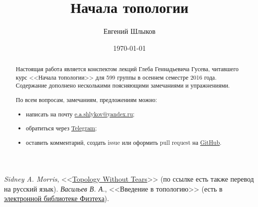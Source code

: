 \documentclass[12pt]{article}
\title{Начала топологии}
\author{Евгений Шлыков}
\affil{Московский физико-технический институт (государственный университет)}
\date{\today}
\theoremstyle{definition}
\theoremstyle{remark}
\theoremstyle{remark}
\theoremstyle{remark}
\theoremstyle{remark}
\begin{document}
\maketitle

\begin{abstract}
	Настоящая работа является конспектом лекций Глеба Геннадьевича Гусева, читавшего курс <<Начала топологии>>
	для 599 группы в осеннем семестре 2016 года. Содержание дополнено несколькими поясняющими замечаниями
	и упражнениями.

	По всем вопросам, замечаниям, предложениям можно:
	\begin{itemize}
		\item написать на почту
			\href{mailto:e.a.shlykov@yandex.ru?subject=[diht-topology-notes]}{e.a.shlykov@yandex.ru};
		\item обратиться через \href{https://t.me/Evgeny_SHL}{Telegram};
		\item оставить комментарий, создать issue или оформить pull request на
			\href{https://github.com/Evgeny-SHL/diht-topology-notes}{GitHub}.
	\end{itemize}
\end{abstract}

\newpage \tableofcontents \newpage

\begin{thebibliography}{9}
	 \textit{Sidney A. Morris}, <<\href{http://www.topologywithouttears.net}{Topology Without Tears}>>
		(по ссылке есть также перевод на русский язык).
	 \textit{Васильев В. А.}, <<Введение в топологию>>
		(есть в \href{http://lib.mipt.ru}{электронной библиотеке Физтеха}).
\end{thebibliography}









\end{document}
